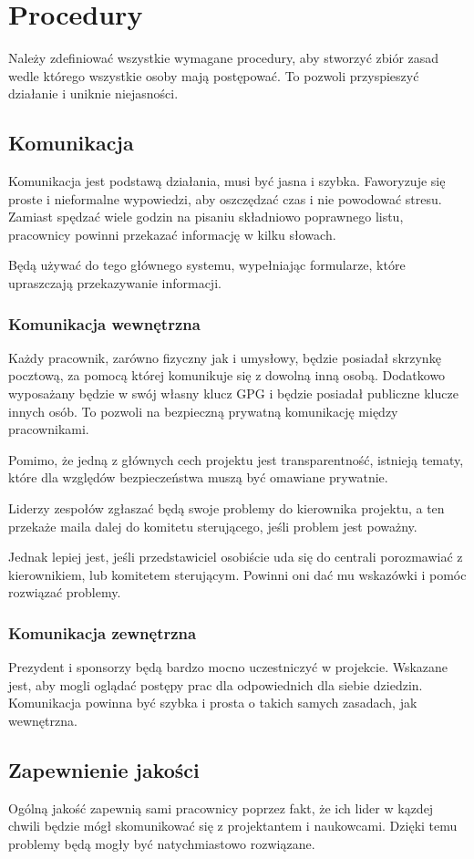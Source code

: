 \section{Procedury}
Należy zdefiniować wszystkie wymagane procedury, aby stworzyć zbiór zasad wedle którego wszystkie osoby mają postępować.
To pozwoli przyspieszyć działanie i uniknie niejasności.
\subsection{Komunikacja}
Komunikacja jest podstawą działania, musi być jasna i szybka. Faworyzuje się proste i nieformalne wypowiedzi, aby oszczędzać czas i nie powodować stresu.
Zamiast spędzać wiele godzin na pisaniu składniowo poprawnego listu, pracownicy powinni przekazać informację w kilku słowach.

Będą używać do tego głównego systemu, wypełniając formularze, które upraszczają przekazywanie informacji.
\subsubsection{Komunikacja wewnętrzna}
Każdy pracownik, zarówno fizyczny jak i umysłowy, będzie posiadał skrzynkę pocztową, za pomocą której komunikuje się z dowolną inną osobą.
Dodatkowo wyposażany będzie w swój własny klucz GPG i będzie posiadał publiczne klucze innych osób.
To pozwoli na bezpieczną prywatną komunikację między pracownikami.

Pomimo, że jedną z głównych cech projektu jest transparentność, istnieją tematy, które dla względów bezpieczeństwa muszą być omawiane prywatnie.

Liderzy zespołów zgłaszać będą swoje problemy do kierownika projektu, a ten przekaże maila dalej do komitetu sterującego, jeśli problem jest poważny.

Jednak lepiej jest, jeśli przedstawiciel osobiście uda się do centrali porozmawiać z kierownikiem, lub komitetem sterującym.
Powinni oni dać mu wskazówki i pomóc rozwiązać problemy.

\subsubsection{Komunikacja zewnętrzna}
Prezydent i sponsorzy będą bardzo mocno uczestniczyć w projekcie. Wskazane jest, aby mogli oglądać postępy prac dla odpowiednich dla siebie dziedzin.
Komunikacja powinna być szybka i prosta o takich samych zasadach, jak wewnętrzna.

\subsection{Zapewnienie jakości}
Ogólną jakość zapewnią sami pracownicy poprzez fakt, że ich lider w kązdej chwili będzie mógł skomunikować się z projektantem i naukowcami.
Dzięki temu problemy będą mogły być natychmiastowo rozwiązane.

